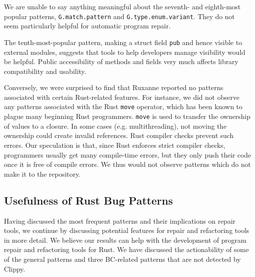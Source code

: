 We are unable to say anything meaningful about the seventh- and eighth-most popular patterns, \texttt{G.match.pattern} and \texttt{G.type.enum.variant}. They do not seem particularly helpful for automatic program repair.

The tenth-most-popular pattern, making a struct field \texttt{pub} and hence visible to external modules, suggests that tools to help developers manage visibility would be helpful. Public accessibility of methods and fields very much affects library compatibility and usability.

Conversely, we were surprised to find that Ruxanne reported no patterns associated with certain Rust-related features. For instance, we did not observe any patterns associated with the Rust \verb+move+ operator, which has been known to plague many beginning Rust programmers. \verb+move+ is used to transfer the ownership of values to a closure. In some cases (e.g. multithreading), not moving the ownership could create invalid references. Rust compiler checks prevent such errors. Our speculation is that, since Rust enforces strict compiler checks, programmers usually get many compile-time errors, but they only push their code once it is free of compile errors. We thus would not observe patterns which do not make it to the repository.

\vspace*{1em}

\subsection{Usefulness of Rust Bug Patterns}

Having discussed the most frequent patterns and their implications on repair tools, we continue by discussing potential features for repair and refactoring tools in more detail. We believe our results can help with the development of program repair and refactoring tools for Rust. We have discussed the actionability of some of the general patterns and three BC-related patterns that are not detected by Clippy.

